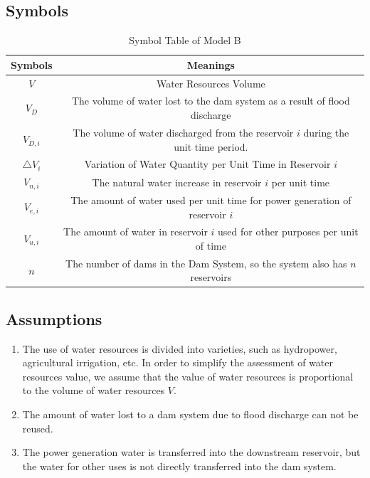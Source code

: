 \documentclass{mcmthesis}
\begin{document}
\subsection{Symbols}

\begin{table}[h]
\centering
  \begin{tabular}{cc}
  \hline
  Symbols & Meanings \\
  \hline
  $V$ & Water Resources Volume \\
  $V_{D}$ & The volume of water lost to the dam system as a result of flood discharge \\
  $V_{D,i}$ & The volume of water discharged from the reservoir $i$ during the unit time period.\\
  $\triangle V_{i}$ & Variation of Water Quantity per Unit Time in Reservoir $i$\\
  $V_{n, i}$ & The natural water increase in reservoir $i$ per unit time \\
  $V_{e, i}$ & The amount of water used per unit time for power generation of reservoir $i$\\
  $V_{u, i}$ & The amount of water in reservoir $i$ used for other purposes per unit of time \\
  $n$ & The number of dams in the Dam System, so the system also has $n$ reservoirs \\
  \hline
  \end{tabular}
\caption{Symbol Table of Model B}
\end{table}

\subsection{Assumptions}
\begin{enumerate}
  \item The use of water resources is divided into varieties, such as hydropower, agricultural irrigation, etc. In order to simplify the assessment of water resources value, we assume that the value of water resources is proportional to the volume of water resources $V$. 
  \item The amount of water lost to a dam system due to flood discharge can not be reused.
  \item The power generation water is transferred into the downstream reservoir, but the water for other uses is not directly transferred into the dam system.
\end{enumerate}
\end{document}
